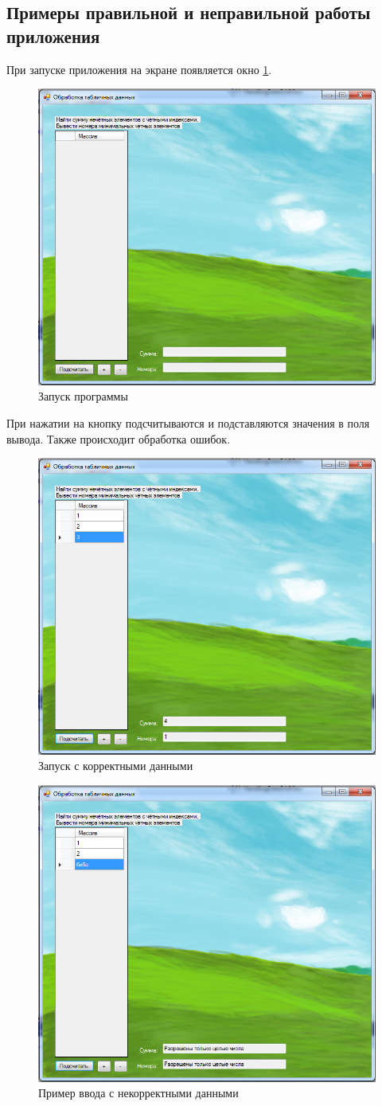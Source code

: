 \subsection{Примеры правильной и неправильной работы приложения}
При запуске приложения на экране появляется окно \ref{fig:handling-data-easy-start}.

\begin{figure}
\centering
\includegraphics[width=0.5\linewidth]{images//handling-data-easy/start.png}
\caption{Запуск программы}
\label{fig:handling-data-easy-start}
\end{figure}

При нажатии на кнопку подсчитываются и подставляются значения в поля вывода. Также происходит обработка ошибок.

\begin{figure}
\centering
\includegraphics[width=0.5\linewidth]{images//handling-data-easy/okay.png}
\caption{Запуск с корректными данными}
\label{fig:handling-data-easy-okay}
\end{figure}

\begin{figure}
\centering
\includegraphics[width=0.5\linewidth]{images//handling-data-easy/error.png}
\caption{Пример ввода с некорректными данными}
\label{fig:handling-data-easy-error}
\end{figure}

